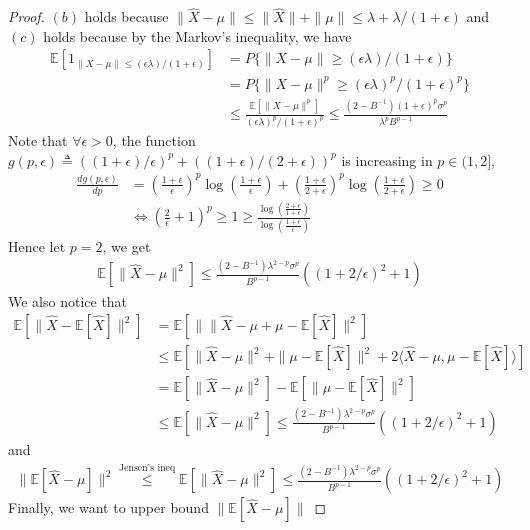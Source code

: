 \documentclass{article}
\def \E {\mathbb{E}}
\begin{document}
\begin{proof}
    $(b)$ holds because $\|\hat{X}-\mu\|\leq \|\hat{X}\| + \|\mu\|\leq \lambda + \lambda/(1+\epsilon)$ and $(c)$ holds because by the Markov's inequality, we have
    \begin{align}
        \E[1_{\|X-\mu\|\leq (\epsilon\lambda)/(1+\epsilon)}]
        &= P\{\|X-\mu\|\geq (\epsilon\lambda)/(1+\epsilon)\} \nonumber\\
        &= P\{\|X-\mu\|^p\geq (\epsilon\lambda)^p/(1+\epsilon)^p\}\nonumber\\
        &\leq \frac{\E[\|X-\mu\|^p]}{(\epsilon\lambda)^p/(1+\epsilon)^p} \leq \frac{(2-B^{-1})(1+\epsilon)^p\sigma^p}{\lambda^pB^{p-1}}
    \end{align}
    Note that $\forall \epsilon>0$, the function $g(p,\epsilon)\triangleq ((1+\epsilon)/\epsilon)^p+((1+\epsilon)/(2+\epsilon))^p$ is increasing in $p\in(1,2]$, 
    \begin{align}
        \frac{dg(p,\epsilon)}{dp} &= \left(\frac{1+\epsilon}{\epsilon}\right)^p\log\left(\frac{1+\epsilon}{\epsilon}\right) + \left(\frac{1+\epsilon}{2+\epsilon}\right)^p\log\left(\frac{1+\epsilon}{2+\epsilon}\right)\geq 0\nonumber\\
        &\Longleftrightarrow \left(\frac{2}{\epsilon}+1\right)^p \geq 1\geq \frac{\log\left(\frac{2+\epsilon}{1+\epsilon}\right)}{\log\left(\frac{1+\epsilon}{\epsilon}\right)}
    \end{align}
    Hence let $p=2$, we get
    \begin{align}
        \E[\|\hat{X}-\mu\|^2]\leq \frac{(2-B^{-1})\lambda^{2-p}\sigma^p}{B^{p-1}} \left((1+2/\epsilon)^2+1\right)
    \end{align}
We also notice that
\begin{align}
    \E[\|\hat{X}-\E[\hat{X}]\|^2] &= \E[\|\|\hat{X}-\mu+\mu-\E[\hat{X}]\|^2]\nonumber\\
    &\leq \E[\|\hat{X}-\mu\|^2+\|\mu-\E[\hat{X}]\|^2+2\langle\hat{X}-\mu,\mu-\E[\hat{X}]\rangle]\nonumber\\
    &=\E[\|\hat{X}-\mu\|^2] - \E[\|\mu-\E[\hat{X}]\|^2]\nonumber\\
    &\leq \E[\|\hat{X}-\mu\|^2]\leq
    \frac{(2-B^{-1})\lambda^{2-p}\sigma^p}{B^{p-1}} \left((1+2/\epsilon)^2+1\right)
\end{align}
and 
\begin{align}
    \|\E[\hat{X}-\mu]\|^2\overset{\text{Jensen's ineq}}{\leq} \E[\|\hat{X}-\mu\|^2]\leq \frac{(2-B^{-1})\lambda^{2-p}\sigma^p}{B^{p-1}} \left((1+2/\epsilon)^2+1\right)
\end{align}
Finally, we want to upper bound $\|\E[\hat{X}-\mu]\|$

\end{proof}
\end{document}
